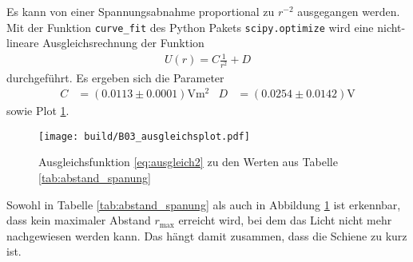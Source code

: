 \noindent
Es kann von einer Spannungsabnahme proportional zu $r^{-2}$ ausgegangen werden.
Mit der Funktion \texttt{curve\_fit} des Python \cite[]{python} Pakets \texttt{scipy.optimize} \cite[]{scipy} wird eine nicht-lineare Ausgleichsrechnung
der Funktion 
\begin{align}
    \label{eq:ausgleich2}
    U(r) = C \frac{1}{r^{2}} + D
\end{align}
durchgeführt.
Es ergeben sich die Parameter 
\begin{align*}
    C &= \left(\num[]{0.0113} \pm \num[]{0.0001}\right)\unit{\volt\meter\squared} & D &= \left(\num[]{0.0254} \pm \num[]{0.0142}\right)\unit{\volt} 
\end{align*}
sowie Plot \ref{fig:ausgleich3_plot}.
%
\begin{figure}
    \texttt{[image: build/B03\_ausgleichsplot.pdf]}
    \caption[]{Ausgleichsfunktion \eqref{eq:ausgleich2} zu den Werten aus Tabelle \ref{tab:abstand_spanung}}
    \label{fig:ausgleich3_plot}
\end{figure}

\noindent
Sowohl in Tabelle \ref{tab:abstand_spanung} als auch in Abbildung \ref{fig:ausgleich3_plot} ist erkennbar, 
dass kein maximaler Abstand $r_\text{max}$ erreicht wird, bei dem das Licht nicht mehr nachgewiesen werden kann.
Das hängt damit zusammen, dass die Schiene zu kurz ist.


